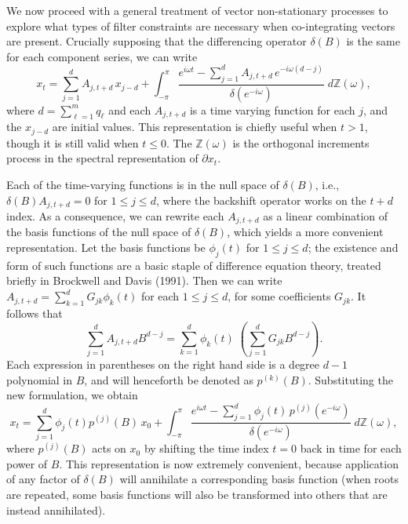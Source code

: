 \documentclass[a4paper]{book}
\def\ZZ{\mathbb Z}
\begin{document}
 We now proceed with a general treatment of vector non-stationary
 processes to explore what types of filter constraints are necessary
 when co-integrating vectors are present.  Crucially supposing that the
 differencing operator $\delta (B)$ is the same for each component
 series, we can write
\[
 x_t = \sum_{j=1}^d A_{j, t+d} \, x_{j-d} + \int_{-\pi}^{\pi}
 \frac{ e^{i \omega t} - \sum_{j=1}^d A_{j,t+d} \, e^{-i \omega
 (d-j)} }{ \delta (e^{-i \omega}) } \; d \ZZ (\omega),
\]
 where $d = \sum_{\ell=1}^m q_{\ell}$ and each $A_{j, t+d}$ is a
 time varying function for each $j$, and the $x_{j-d}$ are initial
 values.  This representation is chiefly useful when $t > 1$, though
 it is still valid when $t \leq 0$.  The $\ZZ (\omega)$ is the
 orthogonal increments process in the spectral representation of
 $\partial x_t$. 

 Each of the time-varying functions is in the null
 space of $\delta (B)$, i.e., $\delta (B) A_{j, t+d} = 0$ for $1 \leq
 j \leq d$, where the backshift operator works on the $t+d$ index.
 As a consequence, we can rewrite each $A_{j,t+d}$ as a linear
 combination of the basis functions of the null space of $\delta
 (B)$, which yields a more convenient representation.  Let the basis
 functions be $\phi_j (t) $ for $1 \leq j \leq d$; the existence and
 form of such functions are a basic staple of difference equation
 theory, treated briefly in Brockwell and Davis (1991).  Then we can
 write $A_{j,t+d} = \sum_{k=1}^d G_{jk} \phi_k (t)$ for each $1 \leq
 j \leq d$, for some coefficients $G_{jk}$.  It follows that
\[
 \sum_{j=1}^d A_{j,t+d} B^{d-j} = \sum_{k=1}^d \phi_k (t)  \; \left(
 \sum_{j=1}^d G_{jk} B^{d-j} \right).
\]
 Each expression in parentheses on the right hand side is a degree
 $d-1$ polynomial in $B$, and will henceforth be denoted as $p^{(k)}
 (B)$.   Substituting the new formulation, we obtain
\[
 x_t = \sum_{j=1}^d \phi_j (t) p^{(j)} (B) \, x_{0} + \int_{-\pi}^{\pi}
 \frac{ e^{i \omega t} - \sum_{j=1}^d \phi_j (t) \, p^{(j)} ( e^{-i \omega
 } )}{ \delta (e^{-i \omega}) } \; d \ZZ (\omega),
\]
 where $p^{(j)} (B)$ acts on $x_0$ by shifting the time index $t=0$
 back in time for each power of $B$.  This representation is now
 extremely convenient, because application of any factor of
 $\delta(B)$ will annihilate a corresponding basis function (when
 roots are repeated, some basis functions will also be transformed
 into others that are instead annihilated). 
\end{document}
